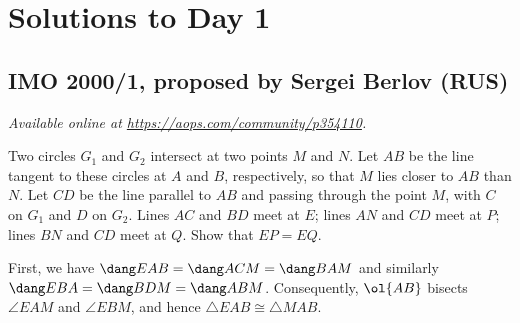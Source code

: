 \documentclass[11pt]{scrartcl}
\begin{document}
\section{Solutions to Day 1}
\subsection{IMO 2000/1, proposed by Sergei Berlov (RUS)}
\textsl{Available online at \url{https://aops.com/community/p354110}.}
\begin{mdframed}[style=mdpurplebox,frametitle={Problem statement}]
Two circles $G_1$ and $G_2$ intersect at two points $M$ and $N$.
Let $AB$ be the line tangent to these circles at $A$ and $B$,
respectively, so that $M$ lies closer to $AB$ than $N$.
Let $CD$ be the line parallel to $AB$
and passing through the point $M$,
with $C$ on $G_1$ and $D$ on $G_2$.
Lines $AC$ and $BD$ meet at $E$; lines $AN$ and $CD$ meet at $P$;
lines $BN$ and $CD$ meet at $Q$.
Show that $EP = EQ$.
\end{mdframed}
First, we have $\dang EAB = \dang ACM = \dang BAM$
and similarly $\dang EBA = \dang BDM = \dang ABM$.
Consequently, $\ol{AB}$ bisects $\angle EAM$ and $\angle EBM$,
and hence $\triangle EAB \cong \triangle MAB$.
\end{document}

